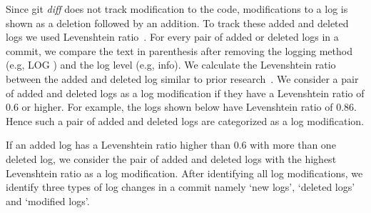 Since git \textsl{diff} does not track modification to the code, modifications to a log is shown as a deletion followed by an addition. To track these added and deleted logs we used Levenshtein ratio~\cite{Levenshtein2}. For every pair of added or deleted logs in a commit, we compare the text in parenthesis after removing the logging method (e.g, LOG ) and the log level (e.g, info). We calculate the Levenshtein ratio between the added and deleted log similar to prior research~\cite{levenshteinratio}. We consider a pair of added and deleted logs as a log modification if they have a Levenshtein ratio of 0.6 or higher. For example, the logs shown below have Levenshtein ratio of 0.86. Hence such a pair of added and deleted logs are categorized as a log modification.  

If an added log has a Levenshtein ratio higher than 0.6 with more than one deleted log, we consider the pair of added and deleted logs with the highest Levenshtein ratio as a log modification. After identifying all log modifications, we identify three types of log changes in a commit namely `new logs', `deleted logs' and `modified logs'.

